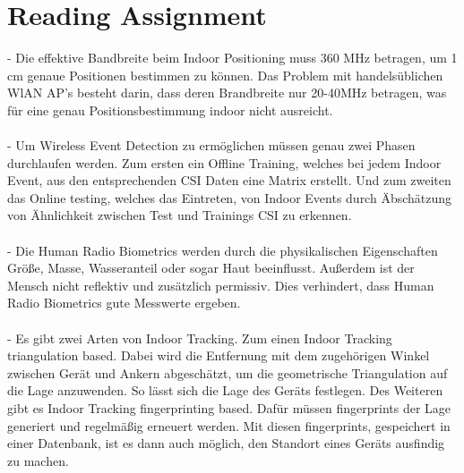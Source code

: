 \documentclass[12pt,a4paper]{article}
\begin{document}
\newpage

\section{Reading Assignment}
- Die effektive Bandbreite beim Indoor Positioning muss 360 MHz betragen, um 1 cm genaue Positionen bestimmen zu können. Das Problem mit handelsüblichen WlAN AP's besteht darin, dass deren Brandbreite nur 20-40MHz betragen, was für eine genau Positionsbestimmung indoor nicht ausreicht.\\\\
- Um Wireless Event Detection zu ermöglichen müssen genau zwei Phasen durchlaufen werden. Zum ersten ein Offline Training, welches bei jedem Indoor Event, aus den entsprechenden CSI Daten eine Matrix erstellt. Und zum zweiten das Online testing, welches das Eintreten, von Indoor Events durch Äbschätzung von Ähnlichkeit zwischen Test und Trainings CSI zu erkennen.\\\\
- Die Human Radio Biometrics werden durch die physikalischen Eigenschaften Größe, Masse, Wasseranteil oder sogar Haut beeinflusst. Außerdem ist der Mensch nicht reflektiv und zusätzlich permissiv. Dies verhindert, dass Human Radio Biometrics gute Messwerte ergeben. \\\\
- Es gibt zwei Arten von Indoor Tracking. Zum einen Indoor Tracking triangulation based. Dabei wird die Entfernung mit dem zugehörigen Winkel zwischen Gerät und Ankern abgeschätzt, um die geometrische Triangulation auf die Lage anzuwenden. So lässt sich die Lage des Geräts festlegen. Des Weiteren gibt es Indoor Tracking fingerprinting based. Dafür müssen fingerprints der Lage generiert und regelmäßig erneuert werden. Mit diesen fingerprints, gespeichert in einer Datenbank, ist es dann auch möglich, den Standort eines Geräts ausfindig zu machen.
\end{document}
